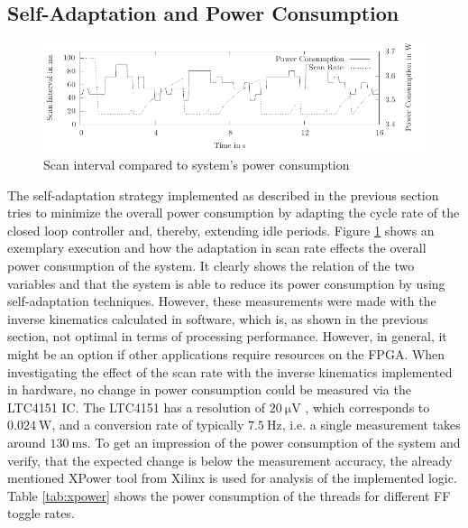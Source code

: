 \subsection{Self-Adaptation and Power Consumption}
\begin{figure}
	\centering
	\includegraphics{../figures/selfadapt_pw}
	\caption{Scan interval compared to system's power consumption}
	\label{fig:selfadapt_pw}
\end{figure}
The self-adaptation strategy implemented as described in the previous section
tries to minimize the overall power consumption by adapting the cycle rate of
the closed loop controller and, thereby, extending idle periods. Figure
\ref{fig:selfadapt_pw} shows an exemplary execution and how the adaptation in
scan rate effects the overall power consumption of the system. It clearly
shows the relation of the two variables and that the system is able to reduce
its power consumption by using self-adaptation techniques. However, these
measurements were made with the inverse kinematics calculated in software,
which is, as shown in the previous section, not optimal in terms of processing
performance. However, in general, it might be an option if other applications
require resources on the \ac{FPGA}. When investigating the effect of the scan
rate with the inverse kinematics implemented in hardware, no change in power
consumption could be measured via the LTC4151 \ac{IC}. The LTC4151 has a
resolution of $\SI{20}{\micro\volt}$ \citep{LTC4151}, which corresponds to
$\SI{0.024}{\watt}$, and a conversion rate of typically $\SI{7.5}{\hertz}$,
i.e. a single measurement takes around $\SI{130}{\milli\second}$. To get an
impression of the power consumption of the system and verify, that the
expected change is below the measurement accuracy, the already mentioned
XPower tool from Xilinx is used for analysis of the implemented logic. Table
\ref{tab:xpower} shows the power consumption of the threads for different
\ac{FF} toggle rates.
